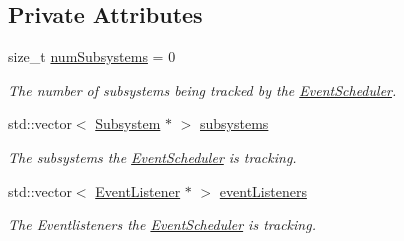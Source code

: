 \subsection*{Private Attributes}
\begin{DoxyCompactItemize}
\item 
\mbox{\label{classlib_iterative_robot_1_1_event_scheduler_a54fd5203a21eb54497840e03ec179f30}} 
size\+\_\+t \mbox{\hyperlink{classlib_iterative_robot_1_1_event_scheduler_a54fd5203a21eb54497840e03ec179f30}{num\+Subsystems}} = 0
\begin{DoxyCompactList}\small\item\em The number of subsystems being tracked by the \mbox{\hyperlink{classlib_iterative_robot_1_1_event_scheduler}{Event\+Scheduler}}. \end{DoxyCompactList}\item 
\mbox{\label{classlib_iterative_robot_1_1_event_scheduler_a37e13e6049f502dbadbc0c81345ff206}} 
std\+::vector$<$ \mbox{\hyperlink{classlib_iterative_robot_1_1_subsystem}{Subsystem}} $\ast$ $>$ \mbox{\hyperlink{classlib_iterative_robot_1_1_event_scheduler_a37e13e6049f502dbadbc0c81345ff206}{subsystems}}
\begin{DoxyCompactList}\small\item\em The subsystems the \mbox{\hyperlink{classlib_iterative_robot_1_1_event_scheduler}{Event\+Scheduler}} is tracking. \end{DoxyCompactList}\item 
\mbox{\label{classlib_iterative_robot_1_1_event_scheduler_abc088d35399b0b1eaa20d573acbdd21e}} 
std\+::vector$<$ \mbox{\hyperlink{classlib_iterative_robot_1_1_event_listener}{Event\+Listener}} $\ast$ $>$ \mbox{\hyperlink{classlib_iterative_robot_1_1_event_scheduler_abc088d35399b0b1eaa20d573acbdd21e}{event\+Listeners}}
\begin{DoxyCompactList}\small\item\em The Eventlisteners the \mbox{\hyperlink{classlib_iterative_robot_1_1_event_scheduler}{Event\+Scheduler}} is tracking. \end{DoxyCompactList}\item 
\mbox{\label{classlib_iterative_robot_1_1_event_scheduler_a24710c3528945cb3ed1e9ae61267b570}} 

\end{DoxyCompactItemize}

